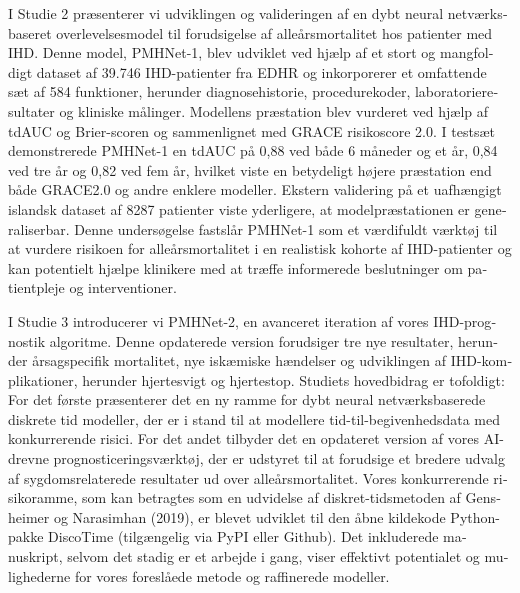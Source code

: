 \begin{@empty}
\begin{otherlanguage}{danish}
I Studie 2 præsenterer vi udviklingen og valideringen af en dybt neural
netværksbaseret overlevelsesmodel til forudsigelse af alleårsmortalitet hos
patienter med IHD. Denne model, PMHNet-1, blev udviklet ved hjælp af et stort
og mangfoldigt dataset af 39.746 IHD-patienter fra EDHR og inkorporerer et
omfattende sæt af 584 funktioner, herunder diagnosehistorie, procedurekoder,
laboratorieresultater og kliniske målinger. Modellens præstation blev vurderet
ved hjælp af tdAUC og Brier-scoren og sammenlignet med GRACE risikoscore 2.0. I
testsæt demonstrerede PMHNet-1 en tdAUC på 0,88 ved både 6 måneder og et år,
0,84 ved tre år og 0,82 ved fem år, hvilket viste en betydeligt højere
præstation end både GRACE2.0 og andre enklere modeller. Ekstern validering på
et uafhængigt islandsk dataset af 8287 patienter viste yderligere, at
modelpræstationen er generaliserbar. Denne undersøgelse fastslår PMHNet-1 som
et værdifuldt værktøj til at vurdere risikoen for alleårsmortalitet i en
realistisk kohorte af IHD-patienter og kan potentielt hjælpe klinikere med at
træffe informerede beslutninger om patientpleje og interventioner.

I Studie 3 introducerer vi PMHNet-2, en avanceret iteration af vores
IHD-prognostik algoritme. Denne opdaterede version forudsiger tre nye
resultater, herunder årsagspecifik mortalitet, nye iskæmiske hændelser og
udviklingen af IHD-komplikationer, herunder hjertesvigt og hjertestop. Studiets
hovedbidrag er tofoldigt: For det første præsenterer det en ny ramme for dybt
neural netværksbaserede diskrete tid modeller, der er i stand til at modellere
tid-til-begivenhedsdata med konkurrerende risici. For det andet tilbyder det en
opdateret version af vores AI-drevne prognosticeringsværktøj, der er udstyret
til at forudsige et bredere udvalg af sygdomsrelaterede resultater ud over
alleårsmortalitet. Vores konkurrerende risikoramme, som kan betragtes som en
udvidelse af diskret-tidsmetoden af Gensheimer og Narasimhan (2019), er blevet
udviklet til den åbne kildekode Python-pakke DiscoTime (tilgængelig via PyPI
eller Github). Det inkluderede manuskript, selvom det stadig er et arbejde i
gang, viser effektivt potentialet og mulighederne for vores foreslåede metode
og raffinerede modeller.
    
\end{otherlanguage}
\end{@empty}
